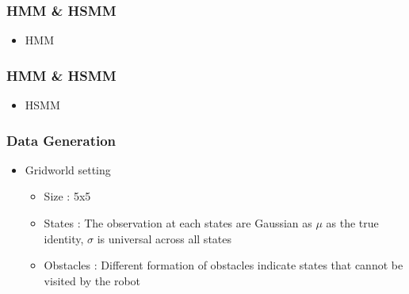 \documentclass{beamer}
\begin{document}
\begin{frame}
    \frametitle{HMM \& HSMM}
        \begin{itemize}
            \item HMM
        \end{itemize}
\end{frame}

\begin{frame}
    \frametitle{HMM \& HSMM}
        \begin{itemize}
            \item HSMM
        \end{itemize}
\end{frame}

\begin{frame}
    \frametitle{Data Generation}
        \begin{itemize}
            \item Gridworld setting
            \begin{itemize}
                \item Size : 5x5
                \item States : The observation at each states are Gaussian as $\mu$ as the true identity, $\sigma$ is universal across all states
                \item Obstacles : Different formation of obstacles indicate states that cannot be visited by the robot
            \end{itemize}
        \end{itemize}
\end{frame}
\end{document}
